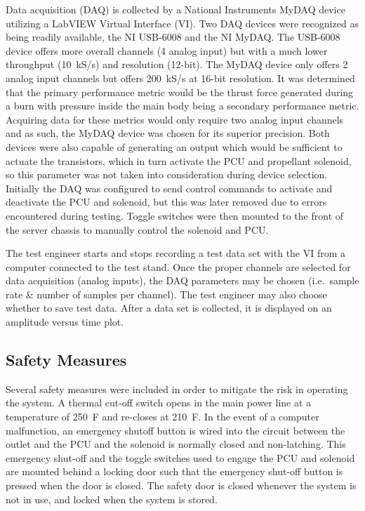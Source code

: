 \documentclass[journal]{IEEEtran}
\begin{document}
Data acquisition (DAQ) is collected by a National Instruments MyDAQ device utilizing a LabVIEW Virtual Interface (VI).
Two DAQ devices were recognized as being readily available, the NI USB-6008 and the NI MyDAQ.\@
The USB-6008 device offers more overall channels (4 analog input) but with a much lower throughput (\SI{10}{kS/s}) and resolution (12-bit).
The MyDAQ device only offers 2 analog input channels but offers \SI{200}{kS/s} at 16-bit resolution. It was determined that the primary performance metric would be the thrust force generated during a burn with pressure inside the main body being a secondary performance metric.
Acquiring data for these metrics would only require two analog input channels and as such, the MyDAQ device was chosen for its superior precision.
Both devices were also capable of generating an output which would be sufficient to actuate the transistors, which in turn activate the PCU and propellant solenoid, so this parameter was not taken into consideration during device selection.
Initially the DAQ was configured to send control commands to activate and deactivate the PCU and solenoid, but this was later removed due to errors encountered during testing. Toggle switches were then mounted to the front of the server chassis to manually control the solenoid and PCU.

The test engineer starts and stops recording a test data set with the VI
from a computer connected to the test stand.
Once the proper channels are selected for data acquisition (analog inputs), the DAQ parameters may be chosen (i.e.\ sample rate \& number of samples per channel).
The test engineer may also choose whether to save test data.
After a data set is collected, it is displayed on an amplitude versus time plot.

\subsection{Safety Measures}
Several safety measures were included in order to mitigate the risk in operating the system. A thermal cut-off switch opens in the main power line at a temperature of \SI{250}{F} and re-closes at \SI{210}{F}. In the event of a computer malfunction, an emergency shutoff button is wired into the circuit between the outlet and the PCU and the solenoid is normally closed and non-latching.
This emergency shut-off and the toggle switches used to engage the PCU and solenoid are mounted behind a locking door such that the emergency shut-off button is pressed when the door is closed.
The safety door is closed whenever the system is not in use, and locked when the system is stored.
\end{document}
